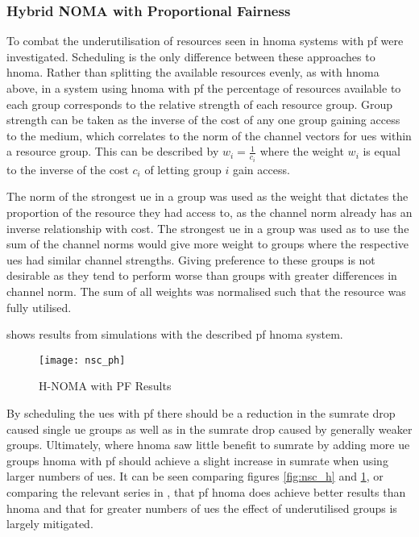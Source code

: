 \subsubsection{Hybrid NOMA with Proportional Fairness}
To combat the underutilisation of resources seen in \ac{hnoma} systems with \ac{pf} were investigated. Scheduling is the only difference between these approaches to \ac{hnoma}.
Rather than splitting the available resources evenly, as with \ac{hnoma} above, in a system using \ac{hnoma} with \ac{pf} the percentage of resources available to each group corresponds to the relative strength of each resource group.
Group strength can be taken as the inverse of the cost of any one group gaining access to the medium, which correlates to the norm of the channel vectors for \acp{ue} within a resource group.
This can be described by $w_i = \frac{1}{c_i}$ where the weight $w_i$ is equal to the inverse of the cost $c_i$ of letting group $i$ gain access.

\par
The norm of the strongest \ac{ue} in a group was used as the weight that dictates the proportion of the resource they had access to, as the channel norm already has an inverse relationship with cost.
The strongest \ac{ue} in a group was used as to use the sum of the channel norms would give more weight to groups where the respective \acp{ue} had similar channel strengths.
Giving preference to these groups is not desirable as they tend to perform worse than groups with greater differences in channel norm.
The sum of all weights was normalised such that the resource was fully utilised.

\par
{} shows results from simulations with the described \ac{pf} \ac{hnoma} system.

\begin{figure}[H]
	\centering
	\texttt{[image: nsc\_ph]}
	\caption{H-NOMA with PF Results}
	\label{fig:nsc_ph}
\end{figure}

\par
By scheduling the \acp{ue} with \ac{pf} there should be a reduction in the sumrate drop caused single \ac{ue} groups as well as in the sumrate drop caused by generally weaker groups.
Ultimately, where \ac{hnoma} saw little benefit to sumrate by adding more \ac{ue} groups \ac{hnoma} with \ac{pf} should achieve a slight increase in sumrate when using larger numbers of \acp{ue}.
It can be seen comparing figures \ref{fig:nsc_h} and \ref{fig:nsc_ph}, or comparing the relevant series in , that \ac{pf} \ac{hnoma} does achieve better results than \ac{hnoma} and that for greater numbers of \acp{ue} the effect of underutilised groups is largely mitigated.

